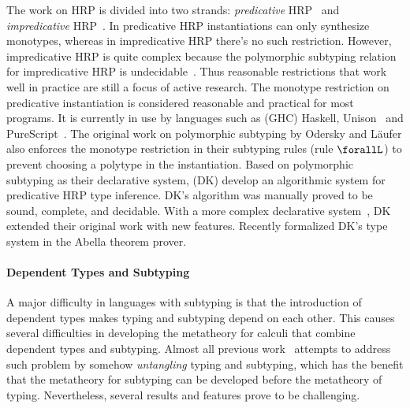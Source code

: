 The work on HRP is divided into two strands: \emph{predicative} HRP~\citep{dunfield2013complete,jones2007practical,odersky1996putting,dunfield2019sound,zhao19mechanical}
and \emph{impredicative} HRP~\citep{le2003ml,leijen2008hmf,vytiniotis2008fph,Serrano2018}.
In predicative HRP instantiations can
only synthesize monotypes, whereas in impredicative HRP there's no
such restriction. However, impredicative HRP is quite complex because
the polymorphic subtyping relation for impredicative HRP is undecidable~\citep{tiuryn1996subtyping}.
Thus reasonable restrictions that work well in practice are still
a focus of active research.
The monotype restriction on predicative instantiation is considered reasonable
and practical for most programs. It is currently in use by languages such as
(GHC) Haskell, Unison~\citep{Unison} and PureScript~\citep{PureScript}.
The original work on polymorphic subtyping by Odersky and L\"aufer also enforces
the monotype restriction in their subtyping rules (rule $\forallL$) to prevent
choosing a polytype in the instantiation. Based on polymorphic subtyping as
their declarative system,
\cite{dunfield2013complete} (DK) develop an
algorithmic system for predicative HRP type inference. DK's algorithm was
manually proved to be sound, complete, and decidable.
With a more complex declarative system~\citep{dunfield2019sound}, DK
extended their original work with new features.
Recently \cite{zhao19mechanical} formalized DK's type system in the Abella
theorem prover.

\paragraph{Dependent Types and Subtyping}
A major difficulty in languages with subtyping is that the introduction of dependent
types makes typing and subtyping depend on each other. This causes
several difficulties in developing the metatheory for calculi that
combine dependent types and subtyping. Almost all previous
work~\citep{subdep,ptssub,chen1,cocsub,Chen03coc} attempts to address such problem by somehow
\emph{untangling} typing and subtyping, which has the benefit that the
metatheory for subtyping can be developed before the metatheory of
typing. Nevertheless, several results and features prove to be
challenging.

